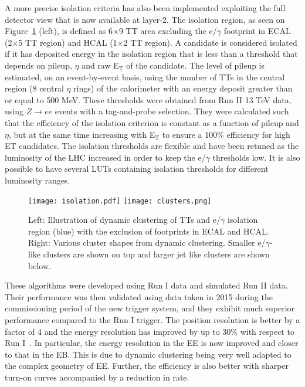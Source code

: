 \documentclass[a4paper,11pt]{article}
\begin{document}
A more precise isolation criteria has also been implemented exploiting the full detector view that is now available at layer-2. The isolation region, as seen on Figure~\ref{fig:k} (left), is defined as 6$\times$9 TT area excluding the e/$\gamma$ footprint in ECAL (2$\times$5 TT region) and HCAL (1$\times$2 TT region). A candidate is considered isolated if it has deposited energy in the isolation region that is less than a threshold that depends on pileup, $\eta$ and raw E$_\text{T}$ of the candidate. The level of pileup is estimated, on an event-by-event basis, using the number of TTs in the central region (8 central $\eta$ rings) of the calorimeter with an energy deposit greater than or equal to 500 MeV. These thresholds were obtained from Run II 13 TeV data, using $Z\rightarrow ee$ events with a tag-and-probe selection. They were calculated such that the efficiency of the isolation criterion is constant as a function of pileup and $\eta$, but at the same time increasing with E$_\text{T}$ to ensure a 100\% efficiency for high ET candidates. The isolation thresholds are flexible and have been retuned as the luminosity of the LHC increased in order to keep the e/$\gamma$ thresholds low. It is also possible to have several LUTs containing isolation thresholds for different luminosity ranges. 



\begin{figure}[htbp]
\centering %
\texttt{[image: isolation.pdf]}
\qquad
\texttt{[image: clusters.png]}
\caption{\label{fig:k} Left: Illustration of dynamic clustering of TTs and e/$\gamma$ isolation region (blue) with the exclusion of footprints in ECAL and HCAL. Right: Various cluster shapes from dynamic clustering. Smaller e/$\gamma$-like clusters are shown on top and larger jet like clusters are shown below.}
\end{figure}

These algorithms were developed using Run I data and simulated Run II data. Their performance was then validated using data taken in 2015 during the commissioning period of the new trigger system, and they exhibit much superior performance compared to the Run I trigger. The position resolution is better by  a factor of 4 and the energy resolution has improved by up to 30\% with respect to Run I~\cite{h}. In particular, the energy resolution in the EE is now improved and closer to that in the EB. This is due to dynamic clustering being very well adapted to the complex geometry of EE. Further, the efficiency is also better with sharper turn-on curves accompanied by a reduction in rate.
\end{document}
